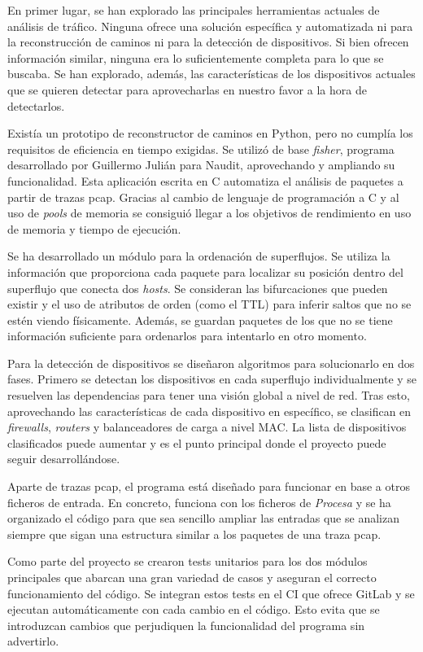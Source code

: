 \documentclass[twoside, 12pt]{epstfg}
\begin{document}
En primer lugar, se han explorado las principales herramientas actuales de análisis de tráfico. Ninguna ofrece una solución específica y automatizada ni para la reconstrucción de caminos ni para la detección de dispositivos. Si bien ofrecen información similar, ninguna era lo suficientemente completa para lo que se buscaba. Se han explorado, además, las características de los dispositivos actuales que se quieren detectar para aprovecharlas en nuestro favor a la hora de detectarlos.

Existía un prototipo de reconstructor de caminos en Python, pero no cumplía los requisitos de eficiencia en tiempo exigidas. Se utilizó de base \textit{fisher}, programa desarrollado por Guillermo Julián para Naudit, aprovechando y ampliando su funcionalidad. Esta aplicación escrita en C automatiza el análisis de paquetes a partir de trazas pcap. Gracias al cambio de lenguaje de programación a C y al uso de \textit{pools} de memoria se consiguió llegar a los objetivos de rendimiento en uso de memoria y tiempo de ejecución.

Se ha desarrollado un módulo para la ordenación de superflujos. Se utiliza la información que proporciona cada paquete para localizar su posición dentro del superflujo que conecta dos \textit{hosts}. Se consideran las bifurcaciones que pueden existir y el uso de atributos de orden (como el TTL) para inferir saltos que no se estén viendo físicamente. Además, se guardan paquetes de los que no se tiene información suficiente para ordenarlos para intentarlo en otro momento.

Para la detección de dispositivos se diseñaron algoritmos para solucionarlo en dos fases. Primero se detectan los dispositivos en cada superflujo individualmente y se resuelven las dependencias para tener una visión global a nivel de red. Tras esto, aprovechando las características de cada dispositivo en específico, se clasifican en \textit{firewalls}, \textit{routers} y balanceadores de carga a nivel MAC. La lista de dispositivos clasificados puede aumentar y es el punto principal donde el proyecto puede seguir desarrollándose.

Aparte de trazas pcap, el programa está diseñado para funcionar en base a otros ficheros de entrada. En concreto, funciona con los ficheros de \textit{Procesa} y se ha organizado el código para que sea sencillo ampliar las entradas que se analizan siempre que sigan una estructura similar a los paquetes de una traza pcap.

Como parte del proyecto se crearon tests unitarios para los dos módulos principales que abarcan una gran variedad de casos y aseguran el correcto funcionamiento del código. Se integran estos tests en el CI que ofrece GitLab y se ejecutan automáticamente con cada cambio en el código. Esto evita que se introduzcan cambios que perjudiquen la funcionalidad del programa sin advertirlo.
\end{document}
